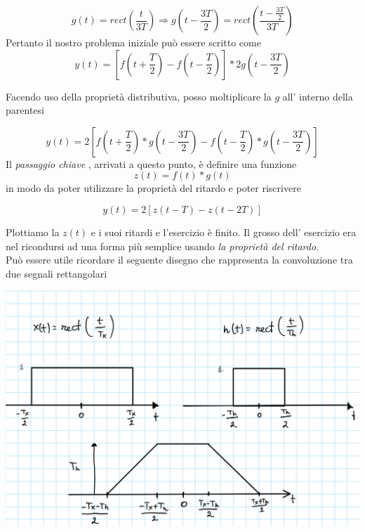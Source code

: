 \documentclass[]{article}
\begin{document}
\begin{enumerate}
\begin{enumerate}
\[g(t)= rect \left( \frac{t}{3T}\right) \Rightarrow g\left( t- \frac{3T}{2}\right)= rect \left( \frac{t- \frac{3T}{2}}{3T}\right)\]
Pertanto il nostro problema iniziale può essere scritto come
\[y(t)= \left[  f \left( t+ \frac{T}{2}\right) - f \left( t- \frac{T}{2}\right)  \right] * 2g\left( t- \frac{3T}{2}\right)   \]

Facendo uso della proprietà distributiva, posso moltiplicare la $g$ all' interno della parentesi

\[ y(t)=2 \left[  f \left( t+ \frac{T}{2}\right)*g\left( t- \frac{3T}{2}\right) - f \left( t- \frac{T}{2}\right)*g\left( t- \frac{3T}{2}\right)  \right]\]
Il \textit{passaggio chiave }, arrivati a questo punto, è definire una funzione
\[ z(t)=f(t)*g(t)\]
in modo da poter utilizzare la proprietà del ritardo e poter riscrivere 

\[y(t)= 2 \left[ z(t-T) - z( t-2T) \right] \]

Plottiamo la $z(t)$ e i suoi ritardi e l'esercizio è finito. Il grosso dell' esercizio era nel ricondursi ad una forma più semplice usando \textit{la proprietà del ritardo}.
\\
Può essere utile ricordare il seguente disegno che rappresenta la convoluzione tra due segnali rettangolari

\begin{center}
\includegraphics[scale=0.3]{convoluzione_rettangoli.png}
\end{center}

\end{enumerate}

\end{enumerate}

\newpage
\end{document}
